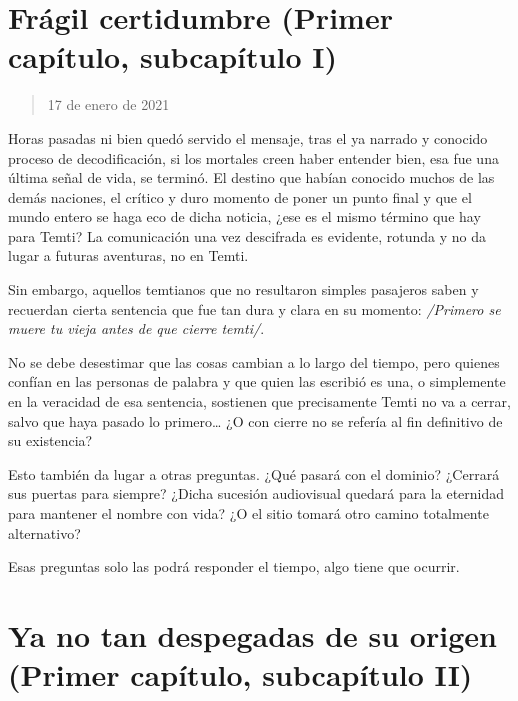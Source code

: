 \documentclass[
  spanish,
]{book}
\begin{document}
\hypertarget{fruxe1gil-certidumbre-primer-capuxedtulo-subcapuxedtulo-i}{%
\section{Frágil certidumbre (Primer capítulo, subcapítulo I)}\label{fruxe1gil-certidumbre-primer-capuxedtulo-subcapuxedtulo-i}}

\begin{quote}
17 de enero de 2021
\end{quote}

Horas pasadas ni bien quedó servido el mensaje, tras el ya narrado y conocido proceso de decodificación, si los mortales creen haber entender bien, esa fue una última señal de vida, se terminó. El destino que habían conocido muchos de las demás naciones, el crítico y duro momento de poner un punto final y que el mundo entero se haga eco de dicha noticia, ¿ese es el mismo término que hay para Temti? La comunicación una vez descifrada es evidente, rotunda y no da lugar a futuras aventuras, no en Temti.

Sin embargo, aquellos temtianos que no resultaron simples pasajeros saben y recuerdan cierta sentencia que fue tan dura y clara en su momento: \emph{/Primero se muere tu vieja antes de que cierre temti/}.

No se debe desestimar que las cosas cambian a lo largo del tiempo, pero quienes confían en las personas de palabra y que quien las escribió es una, o simplemente en la veracidad de esa sentencia, sostienen que precisamente Temti no va a cerrar, salvo que haya pasado lo primero\ldots{} ¿O con cierre no se refería al fin definitivo de su existencia?

Esto también da lugar a otras preguntas. ¿Qué pasará con el dominio? ¿Cerrará sus puertas para siempre? ¿Dicha sucesión audiovisual quedará para la eternidad para mantener el nombre con vida? ¿O el sitio tomará otro camino totalmente alternativo?

Esas preguntas solo las podrá responder el tiempo, algo tiene que ocurrir.

\hypertarget{ya-no-tan-despegadas-de-su-origen-primer-capuxedtulo-subcapuxedtulo-ii}{%
\section{Ya no tan despegadas de su origen (Primer capítulo, subcapítulo II)}\label{ya-no-tan-despegadas-de-su-origen-primer-capuxedtulo-subcapuxedtulo-ii}}
\end{document}
